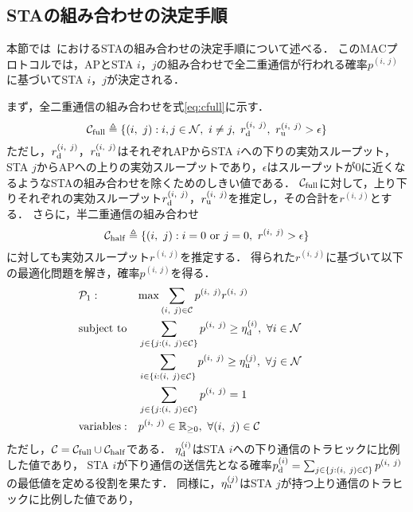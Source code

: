 \documentclass[technicalreport]{ieicej}
\newcommand{\sij}{(i,\ j)}
\newcommand{\pij}{p^{(i,\ j)}}
\newcommand{\rd}{r^{\sij}_{\rm d}}
\newcommand{\ru}{r^{\sij}_{\rm u}}
\newcommand{\rij}{r^{\sij}}
\begin{document}
	\subsection{STAの組み合わせの決定手順}\label{sec:promac}
		本節では~\cite{promac}におけるSTAの組み合わせの決定手順について述べる．
		このMACプロトコルでは，APとSTA $i$，$j$の組み合わせで全二重通信が行われる確率$\pij$に基づいてSTA $i$，$j$が決定される．
		\par
		まず，全二重通信の組み合わせを式\eqref{eq:cfull}に示す．
		\begin{equation}
			{\mathcal C}_{\rm full} \triangleq \{\sij : i,j\in{\mathcal N},\ i\neq j,\ r^{\sij}_{\rm d},\ r^{\sij}_{\rm u}>\epsilon\} \label{eq:cfull}
		\end{equation}
		ただし，$r_{\rm d}^{\sij}$，$r_{\rm u}^{\sij}$はそれぞれAPからSTA $i$への下りの実効スループット，
		STA $j$からAPへの上りの実効スループットであり，$\epsilon$はスループットが0に近くなるようなSTAの組み合わせを除くためのしきい値である．
		${\mathcal C}_{\rm full}$に対して，上り下りそれぞれの実効スループット$\rd$，$\ru$を推定し，その合計を$\rij$とする．
		さらに，半二重通信の組み合わせ
		\begin{equation}
			{\mathcal C}_{\rm half} \triangleq \{\sij : i=0\ {\rm or}\ j=0,\ \rij >\epsilon\}
		\end{equation}
		に対しても実効スループット$\rij$を推定する．
		得られた$\rij$に基づいて以下の最適化問題を解き，確率$\pij$を得る．
		\begin{align}
			&{\mathcal P}_1: && {\rm max} \sum_{(i,\ j)\in{\mathcal C}} p^{(i,\ j)}r^{(i,\ j)} &&&&&& \label{eq:p1}\\
			&{\rm subject\ to} && \sum_{j\in\{j:(i,\ j)\in{\mathcal C}\}} p^{(i,\ j)} \geq \eta_{\rm d}^{(i)},\ \forall i\in {\mathcal N}  \\
			&&& \sum_{i\in\{i:(i,\ j)\in{\mathcal C}\}} p^{(i,\ j)} \geq \eta_{\rm u}^{(j)},\ \forall j\in {\mathcal N} \label{eq:pu}\\
			&&& \sum_{j\in\{j:(i,\ j)\in{\mathcal C}\}} p^{(i,\ j)}=1 \\
			&{\rm variables:} &&p^{(i,\ j)} \in {\mathbb R}_{\geq 0},\ \forall(i,\ j)\in {\mathcal C} \nonumber
		\end{align}
		ただし，${\mathcal C} = {\mathcal C}_{\rm full} \cup {\mathcal C}_{\rm half}$である．
		$\eta_{\rm d}^{(i)}$はSTA $i$への下り通信のトラヒックに比例した値であり，
		STA $i$が下り通信の送信先となる確率$p_{\rm d}^{(i)}=\sum_{j\in\{j:(i,\ j)\in{\mathcal C}\}} p^{(i,\ j)}$
		の最低値を定める役割を果たす．
		同様に，$\eta_{\rm u}^{(j)}$はSTA $j$が持つ上り通信のトラヒックに比例した値であり，
\end{document}
